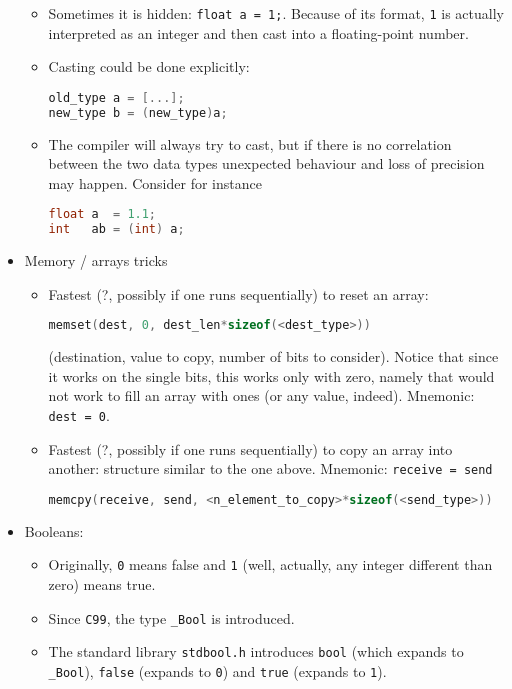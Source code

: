 \documentclass[a4paper,12pt,%
              final%
              ]{article}
\begin{document}
\begin{itemize}
    \begin{itemize}
      \item Sometimes it is hidden: \verb|float a = 1;|. Because of its format, \verb|1| is actually interpreted as an integer and then cast into a floating-point number.
      \item Casting could be done explicitly:
\begin{lstlisting}[language=C]
old_type a = [...];
new_type b = (new_type)a;
\end{lstlisting}
      \item The compiler will always try to cast, but if there is no correlation between the two data types unexpected behaviour and loss of precision may happen. Consider for instance
\begin{lstlisting}[language=C]
float a  = 1.1;
int   ab = (int) a;
\end{lstlisting}
    \end{itemize}
  \item Memory / arrays tricks
    \begin{itemize}
      \item Fastest (?, possibly if one runs sequentially) to reset an array:
\begin{lstlisting}[language=C]
memset(dest, 0, dest_len*sizeof(<dest_type>))
\end{lstlisting}
        (destination, value to copy, number of bits to consider). Notice that since it works on the single bits, this works only with zero, namely that would not work to fill an array with ones (or any value, indeed). Mnemonic: \verb|dest = 0|.
      \item Fastest (?, possibly if one runs sequentially) to copy an array into another: structure similar to the one above. Mnemonic: \verb|receive = send|
\begin{lstlisting}[language=C]
memcpy(receive, send, <n_element_to_copy>*sizeof(<send_type>))
\end{lstlisting}
    \end{itemize}
  \item Booleans:
    \begin{itemize}
      \item Originally, \verb|0| means false and \verb|1| (well, actually, any integer different than zero) means true.
      \item Since \verb|C99|, the type \verb|_Bool| is introduced.
      \item The standard library \verb|stdbool.h| introduces \verb|bool| (which expands to \verb|_Bool|), \verb|false| (expands to \verb|0|) and \verb|true| (expands to \verb|1|).

\end{itemize}
\end{itemize}
\end{document}
